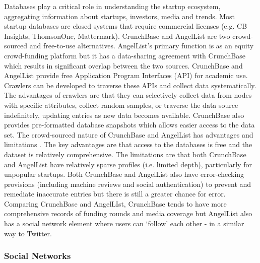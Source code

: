 \documentclass[../thesis/thesis.tex]{subfiles}
\begin{document}
Databases play a critical role in understanding the startup ecosystem, aggregating information about startups, investors, media and trends. Most startup databases are closed systems that require commercial licenses (e.g. CB Insights, ThomsonOne, Mattermark). CrunchBase and AngelList are two crowd-sourced and free-to-use alternatives. AngelList's primary function is as an equity crowd-funding platform but it has a data-sharing agreement with CrunchBase which results in significant overlap between the two sources. CrunchBase and AngelList provide free Application Program Interfaces (API) for academic use. Crawlers can be developed to traverse these APIs and collect data systematically. The advantages of crawlers are that they can selectively collect data from nodes with specific attributes, collect random samples, or traverse the data source indefinitely, updating entries as new data becomes available. CrunchBase also provides pre-formatted database snapshots which allows easier access to the data set. The crowd-sourced nature of CrunchBase and AngelList has advantages and limitations . The key advantages are that access to the databases is free and the dataset is relatively comprehensive. The limitations are that both CrunchBase and AngelList have relatively sparse profiles (i.e. limited depth), particularly for unpopular startups. Both CrunchBase and AngelList also have error-checking provisions (including machine reviews and social authentication) to prevent and remediate inaccurate entries but there is still a greater chance for error. Comparing CrunchBase and AngelLIst, CrunchBase tends to have more comprehensive records of funding rounds \cite{cheng2016} and media coverage but AngelList also has a social network element where users can `follow' each other - in a similar way to Twitter.

\subsubsection{Social Networks}
\end{document}
